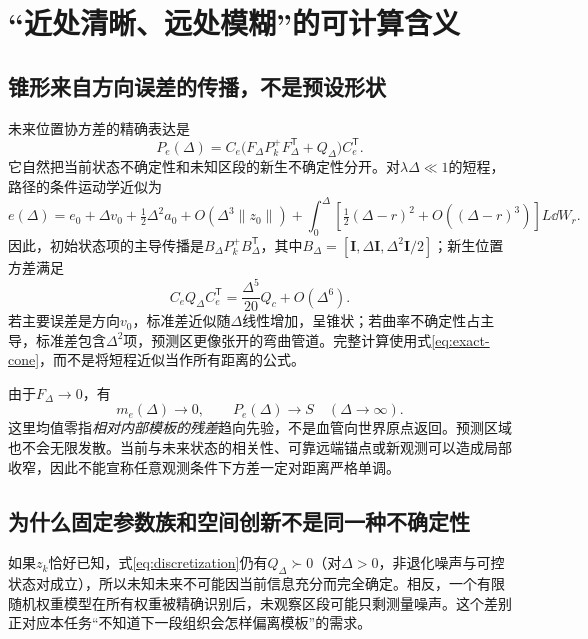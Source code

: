 \documentclass[UTF8,11pt,a4paper,fontset=fandol]{ctexart}
\numberwithin{equation}{section}
\theoremstyle{plain}
\theoremstyle{definition}
\theoremstyle{remark}
\newcommand{\Id}{\mathbf I}\newcommand{\T}{^{\mathsf T}}
\begin{document}
\section{“近处清晰、远处模糊”的可计算含义}\label{sec:tube}
\subsection{锥形来自方向误差的传播，不是预设形状}
未来位置协方差的精确表达是
\begin{equation}
 \boxed{P_e(\Delta)=C_e\bigl(F_\Delta P_k^+F_\Delta\T+Q_\Delta\bigr)C_e\T.}
 \label{eq:exact-cone}
\end{equation}
它自然把当前状态不确定性和未知区段的新生不确定性分开。对$\lambda\Delta\ll1$的短程，路径的条件运动学近似为
\begin{equation}
 e(\Delta)=e_0+\Delta v_0+\tfrac12\Delta^2a_0
 +O(\Delta^3\|z_0\|)
 +\int_0^\Delta\left[\tfrac12(\Delta-r)^2+O((\Delta-r)^3)\right]L\dd W_r.
 \label{eq:short-horizon}
\end{equation}
因此，初始状态项的主导传播是$B_\Delta P_k^+B_\Delta\T$，其中$B_\Delta=[\Id,\Delta\Id,\Delta^2\Id/2]$；新生位置方差满足
\begin{equation}
 C_eQ_\Delta C_e\T=\frac{\Delta^5}{20}Q_c+O(\Delta^6).
 \label{eq:innovation-small}
\end{equation}
若主要误差是方向$v_0$，标准差近似随$\Delta$线性增加，呈锥状；若曲率不确定性占主导，标准差包含$\Delta^2$项，预测区更像张开的弯曲管道。完整计算使用式\eqref{eq:exact-cone}，而不是将短程近似当作所有距离的公式。

由于$F_\Delta\to0$，有
\begin{equation}
 m_e(\Delta)\to0,\qquad P_e(\Delta)\to S\quad(\Delta\to\infty).
 \label{eq:prior-reversion}
\end{equation}
这里均值零指\emph{相对内部模板的残差}趋向先验，不是血管向世界原点返回。预测区域也不会无限发散。当前与未来状态的相关性、可靠远端锚点或新观测可以造成局部收窄，因此不能宣称任意观测条件下方差一定对距离严格单调。

\subsection{为什么固定参数族和空间创新不是同一种不确定性}
如果$z_k$恰好已知，式\eqref{eq:discretization}仍有$Q_\Delta\succ0$（对$\Delta>0$，非退化噪声与可控状态对成立），所以未知未来不可能因当前信息充分而完全确定。相反，一个有限随机权重模型在所有权重被精确识别后，未观察区段可能只剩测量噪声。这个差别正对应本任务“不知道下一段组织会怎样偏离模板”的需求。
\end{document}
